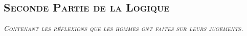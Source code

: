 \subsection{\centering \huge \scshape Seconde Partie de la Logique}
\begin{center}\emph{\Large\scshape Contenant les réflexions que les hommes ont faites sur leurs jugements.}\end{center}
